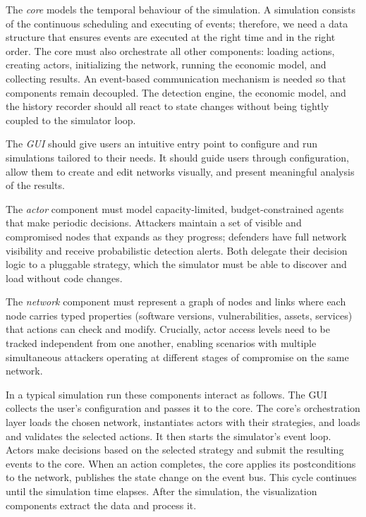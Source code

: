 \documentclass{llncs}
\begin{document}
The \emph{core} models the temporal behaviour of the simulation. A simulation consists of the continuous scheduling and executing of events; therefore, we need a data structure that ensures events are executed at the right time and in the right order. The core must also orchestrate all other components: loading actions, creating actors, initializing the network, running the economic model, and collecting results. An event-based communication mechanism is needed so that components remain decoupled. The detection engine, the economic model, and the history recorder should all react to state changes without being tightly coupled to the simulator loop.

The \emph{GUI} should give users an intuitive entry point to configure and run simulations tailored to their needs. It should guide users through configuration, allow them to create and edit networks visually, and present meaningful analysis of the results.

The \emph{actor} component must model capacity-limited, budget-constrained agents that make periodic decisions. Attackers maintain a set of visible and compromised nodes that expands as they progress; defenders have full network visibility and receive probabilistic detection alerts. Both delegate their decision logic to a pluggable strategy, which the simulator must be able to discover and load without code changes.

The \emph{network} component must represent a graph of nodes and links where each node carries typed properties (software versions, vulnerabilities, assets, services) that actions can check and modify. Crucially, actor access levels need to be tracked independent from one another, enabling scenarios with multiple simultaneous attackers operating at different stages of compromise on the same network.

In a typical simulation run these components interact as follows. The GUI collects the user's configuration and passes it to the core. The core's orchestration layer loads the chosen network, instantiates actors with their strategies, and loads and validates the selected actions. It then starts the simulator's event loop. Actors make decisions based on the selected strategy and submit the resulting events to the core. When an action completes, the core applies its postconditions to the network, publishes the state change on the event bus. This cycle continues until the simulation time elapses. After the simulation, the visualization components extract the data and process it.
\end{document}
